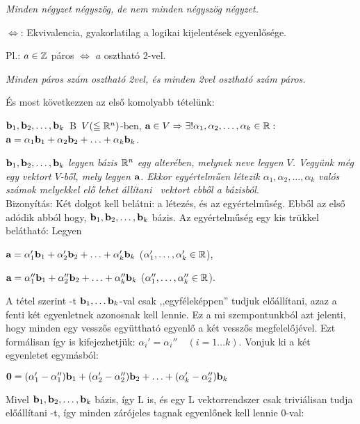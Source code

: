 \documentclass[a4paper,11.5pt]{article}
\begin{document}
	\textit{Minden négyzet négyszög, de nem minden négyszög négyzet.}
	
	\smallskip
	$\Leftrightarrow$: Ekvivalencia, gyakorlatilag a logikai kijelentések egyenlősége.
	
	Pl.: $a \in \mathbb{Z}$ páros $\Leftrightarrow$ $a$ osztható 2-vel.
	
	\textit{Minden páros szám osztható 2vel, és minden 2vel osztható szám páros.}
	
	\smallskip
	És most következzen az első komolyabb tételünk:
	\begin{theorem}
	$\textbf{b}_1, \textbf{b}_2, \ldots , \textbf{b}_k$\ B\ $V(\leqq \mathbb{R}^n)$-ben, $\textbf{a} \in V \Rightarrow \exists! \alpha_1, \alpha_2, \ldots, \alpha_k \in \mathbb{R} :$
	$\textbf{a}=\alpha_1\textbf{b}_1+\alpha_2\textbf{b}_2+\ldots+\alpha_k\textbf{b}_k$.
	\end{theorem}
	
	\textit{$\textbf{b}_1, \textbf{b}_2, \ldots , \textbf{b}_k$ {legyen bázis $\mathbb{R}^n$ egy alterében, melynek neve legyen $V$. Vegyünk még egy vektort $V$-ből, mely legyen }$\textbf{a}$. {Ekkor egyértelműen létezik $\alpha_1, \alpha_2, \ldots, \alpha_k$ valós számok melyekkel elő lehet állítani }\a\ {vektort ebből a bázisból}}.\\
	
	   Bizonyítás: Két dolgot kell belátni: a létezés, és az egyértelműség. Ebből az első adódik abból hogy,  $\textbf{b}_1, \textbf{b}_2, \ldots , \textbf{b}_k$ bázis. Az egyértelműség egy kis trükkel belátható: Legyen
	\begin{center}
		$\textbf{a}=\alpha_1'\textbf{b}_1+\alpha_2'\textbf{b}_2+\ldots+\alpha_k'\textbf{b}_k$ \quad ($\alpha_1',\ldots,\alpha_k'\in\mathbb{R}$),
		
		$\textbf{a}=\alpha_1''\textbf{b}_1+\alpha_2''\textbf{b}_2+\ldots+\alpha_k''\textbf{b}_k$ \quad ($\alpha_1'',\ldots,\alpha_k''\in\mathbb{R}$).
	\end{center}
	
	A tétel szerint \a-t $\textbf{b}_1,\ldots\textbf{b}_k$-val csak ,,egyféleképpen'' tudjuk előállítani, azaz a fenti két egyenletnek azonosnak kell lennie. Ez a mi szempontunkból azt jelenti, hogy minden egy vesszős együttható egyenlő a két vesszős megfelelőjével. Ezt formálisan így is kifejezhetjük: $\alpha_i'=\alpha_i''\quad (i=1\ldots k)$. Vonjuk ki a két egyenletet egymásból:
	
	\begin{center}
		$\textbf{0}=(\alpha_1'-\alpha_1'')\textbf{b}_1+(\alpha_2'-\alpha_2'')\textbf{b}_2+\ldots+(\alpha_k'-\alpha_2'')\textbf{b}_k$
	\end{center}
	
	   Mivel $\textbf{b}_1, \textbf{b}_2, \ldots , \textbf{b}_k$ bázis, így L is, és egy L vektorrendszer csak triviálisan tudja előállítani \0-t, így minden zárójeles tagnak egyenlőnek kell lennie 0-val:
	
\end{document}
